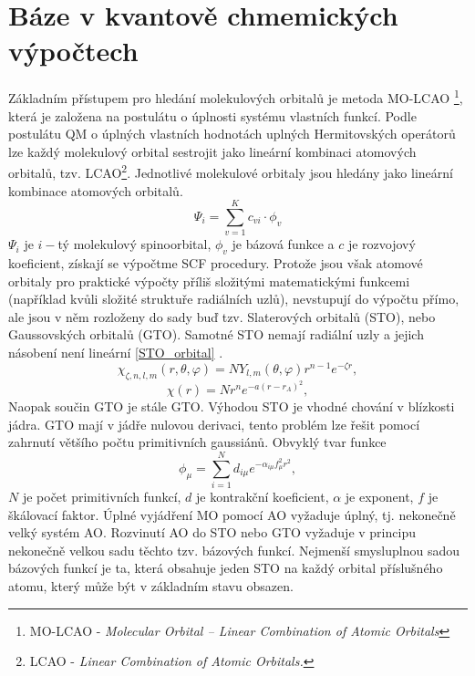 \documentclass[
digital, %
table,   %
lof,     %
lot,     %
oneside,
]{fithesis3}
\begin{document}
\section{Báze v kvantově chmemických výpočtech}
Základním přístupem pro hledání molekulových orbitalů je metoda MO-LCAO \footnote{MO-LCAO - \textit{Molecular Orbital – Linear Combination of Atomic Orbitals}}, která je založena na postulátu o úplnosti systému vlastních funkcí. Podle postulátu QM o úplných vlastních hodnotách uplných Hermitovských operátorů lze každý molekulový orbital sestrojit jako lineární kombinaci atomových orbitalů, tzv. LCAO\footnote{LCAO - \textit{Linear Combination of Atomic Orbitals.}}. Jednotlivé molekulové orbitaly jsou hledány jako lineární kombinace atomových orbitalů.
\begin{equation}
\Psi_i = \sum_{v=1}^{K}c_{vi} \cdot \phi_{v}
\end{equation}
$\Psi_i$ je $i-$tý molekulový spinoorbital, $\phi_{v}$ je bázová funkce a $c$ je rozvojový koeficient, získají se výpočtme SCF procedury. Protože jsou však atomové orbitaly pro praktické výpočty příliš složitými matematickými funkcemi (například kvůli složité struktuře radiálních uzlů), nevstupují do výpočtu přímo, ale jsou v něm rozloženy do sady buď tzv. Slaterových orbitalů (STO), nebo Gaussovských orbitalů (GTO). Samotné STO nemají radiální uzly a jejich násobení není lineární \ref{STO_orbital} \cite{jensen2007introduction}.
\begin{equation}
\chi_{\zeta, n, l, m}(r, \theta, \varphi) = NY_{l,m} (\theta, \varphi) r^{n-1} e^{-\zeta r},
\label{STO_orbital}
\end{equation}
\begin{equation}
\chi(r) = Nr^n e^{-a(r-r_A)^2},
\end{equation}
Naopak součin GTO je stále GTO. Výhodou STO je vhodné chování v blízkosti jádra. GTO mají v jádře nulovou derivaci, tento problém lze řešit pomocí zahrnutí většího počtu primitivních gaussiánů. Obvyklý tvar funkce
\begin{equation}
\phi_\mu = \sum_{i=1}^{N}d_{i\mu}e^{-\alpha_{i\mu}f^2_{\mu}r^2},
\end{equation}
$N$ je počet primitivních funkcí, $d$ je kontrakční koeficient, $\alpha$ je exponent, $f$ je škálovací faktor. Úplné vyjádření MO pomocí AO vyžaduje úplný, tj. nekonečně velký systém AO. Rozvinutí AO do STO nebo GTO vyžaduje v principu nekonečně velkou sadu těchto tzv. bázových funkcí. Nejmenší smysluplnou sadou bázových funkcí je ta, která obsahuje jeden STO na každý orbital příslušného atomu, který může být v základním stavu obsazen.
\end{document}

